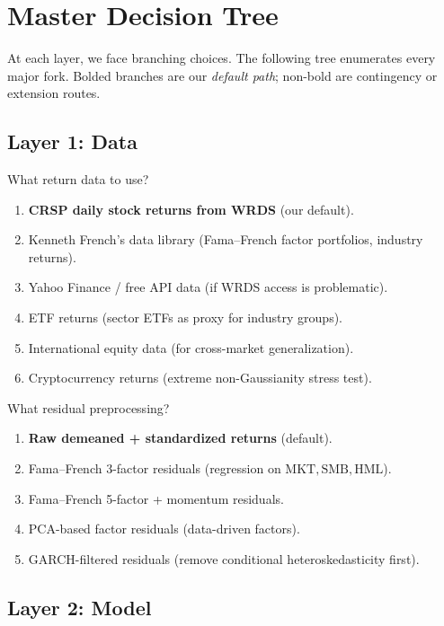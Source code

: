 \documentclass[11pt,a4paper]{article}
\begin{document}
\section{Master Decision Tree}

At each layer, we face branching choices. The following tree enumerates every major fork. Bolded branches are our \emph{default path}; non-bold are contingency or extension routes.

\subsection{Layer 1: Data}

\begin{decision}{What return data to use?}
\begin{enumerate}[nosep]
  \item[\textbf{(a)}] \textbf{CRSP daily stock returns from WRDS} (our default).
  \item[(b)] Kenneth French's data library (Fama--French factor portfolios, industry returns).
  \item[(c)] Yahoo Finance / free API data (if WRDS access is problematic).
  \item[(d)] ETF returns (sector ETFs as proxy for industry groups).
  \item[(e)] International equity data (for cross-market generalization).
  \item[(f)] Cryptocurrency returns (extreme non-Gaussianity stress test).
\end{enumerate}
\end{decision}

\begin{decision}{What residual preprocessing?}
\begin{enumerate}[nosep]
  \item[\textbf{(a)}] \textbf{Raw demeaned + standardized returns} (default).
  \item[(b)] Fama--French 3-factor residuals (regression on $\text{MKT}, \text{SMB}, \text{HML}$).
  \item[(c)] Fama--French 5-factor + momentum residuals.
  \item[(d)] PCA-based factor residuals (data-driven factors).
  \item[(e)] GARCH-filtered residuals (remove conditional heteroskedasticity first).
\end{enumerate}
\end{decision}

\subsection{Layer 2: Model}
\end{document}
